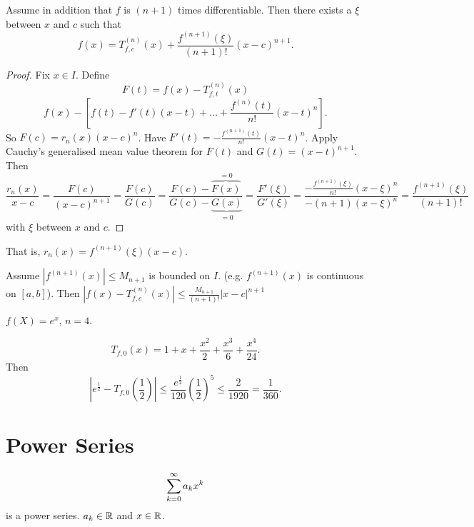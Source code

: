 \documentclass[10pt, a4paper]{article}
\begin{document}
\begin{theorem}
    Assume in addition that $f$ is $(n + 1)$ times differentiable.
    Then there exists a $\xi$ between $x$ and $c$ such that
    \[
    f(x) = T_{f, c} ^ {(n)}(x) + \frac{f ^ {(n + 1)}(\xi)}{(n + 1)!}(x - c) ^ {n + 1}.
    \]

    \begin{proof}
        Fix $x \in I$.
        Define
        \[
        F(t) = f(x) - T_{f, t} ^ {(n)}(x)
        \]
        \[
        f(x) - \left[f(t) - f'(t)(x - t) + \dotsc + \frac{f ^ {(n)}(t)}{n!}(x - t) ^ n\right].
        \]
        So $F(c) = r_n(x)(x - c) ^ n$.
        Have $F'(t) = -\frac{f ^ {(n + 1)}(t)}{n!}(x - t) ^ n$.
        Apply Cauchy's generalised mean value theorem for $F(t)$ and $G(t) = (x - t) ^ {n + 1}$.
        Then
        \[
        \frac{r_n(x)}{x - c} = \frac{F(c)}{(x - c) ^ {n + 1}} = \frac{F(c)}{G(c)} = \frac{F(c) - \overbrace{F(x)}^{= 0}}{G(c) - \underbrace{G(x)}_{= 0}} = \frac{F'(\xi)}{G'(\xi)} = \frac{{-\frac{f ^ {(n + 1)}(\xi)}{n!}(x - \xi) ^ n}}{-(n + 1)(x - \xi) ^ n} = \frac{f ^ {(n + 1)}(\xi)}{(n + 1)!}
        \]
        with $\xi$ between $x$ and $c$.
    \end{proof}
\end{theorem}
That is,
$r_n(x) = f ^ {(n + 1)}(\xi)(x - c)$.


Assume $\left|f ^ {(n + 1)}(x)\right| \leq M_{n + 1}$ is bounded on $I$.
(e.g. $f ^ {(n + 1)}(x)$ is continuous on $[a, b]$).
Then $\left|f(x) - T_{f, c}^{(n)}(x)\right| \leq \frac{M_{n + 1}}{(n + 1)!}|x - c| ^ {n + 1}$

\begin{example}
    $f(X) = e ^ x$,
    $n = 4$.

    \[
    T_{f, 0}(x) = 1 + x + \frac{x ^ 2}{2} + \frac{x ^ 3}{6} + \frac{x ^ 4}{24}.
    \]
    Then
    \[
    \left|e ^ {\frac{1}{2}} - T_{f, 0}\left(\frac{1}{2}\right)\right| \leq \frac{e ^ {\frac{1}{2}}}{120}\left(\frac{1}{2}\right) ^ 5 \leq \frac{2}{1920} = \frac{1}{360}.
    \]
\end{example}

\newpage

\section{Power Series}

\begin{definition}
    \[
    \sum_{k = 0}^{\infty} a_kx ^ k
    \]
    is a power series.
    $a_k \in \mathbb{R}$ and $x \in \mathbb{R}$.
\end{definition}
\end{document}
